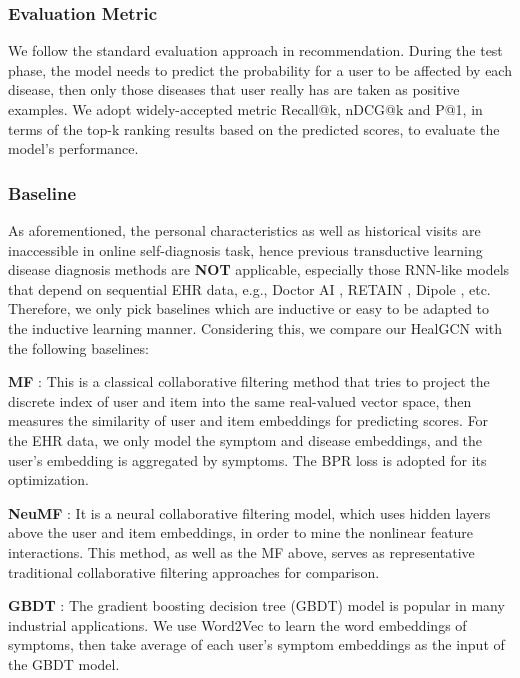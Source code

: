 \documentclass[sigconf]{acmart}
\begin{document}
\subsubsection{Evaluation Metric}
We follow the standard evaluation approach in recommendation. During the test phase, the model needs to predict the probability for a user to be affected by each disease, then only those diseases that user really has are taken as positive examples. We adopt widely-accepted metric Recall@k, nDCG@k and P@1, in terms of the top-k ranking results based on the predicted scores, to evaluate the model's performance. 

\subsubsection{Baseline}
As aforementioned, the personal characteristics as well as historical visits are inaccessible in online self-diagnosis task, hence previous transductive learning disease diagnosis methods are \textbf{NOT} applicable, especially those RNN-like models that depend on sequential EHR data, e.g., Doctor AI \cite{choi2016doctor}, RETAIN \cite{choi2016retain}, Dipole \cite{ma2017dipole}, etc. Therefore, we only pick baselines which are inductive or easy to be adapted to the inductive learning manner. Considering this, we compare our HealGCN with the following baselines:

\textbf{MF} \cite{rendle2012bpr} : This is a classical collaborative filtering method that tries to project the discrete index of user and item into the same real-valued vector space, then measures the similarity of user and item embeddings for predicting scores. For the EHR data, we only model the symptom and disease embeddings, and the user's embedding is aggregated by symptoms. The BPR loss is adopted for its optimization.

\textbf{NeuMF} \cite{he2017neural}: It is a neural collaborative filtering model, which uses hidden layers above the user and item embeddings, in order to mine the nonlinear feature interactions. This method, as well as the MF above, serves as representative traditional collaborative filtering approaches for comparison.

\textbf{GBDT} \cite{ke2017lightgbm}: The gradient boosting decision tree (GBDT) model is popular in many industrial applications. We use Word2Vec \cite{mikolov2013distributed} to learn the word embeddings of symptoms, then take average of each user's symptom embeddings as the input of the GBDT model.
\end{document}
